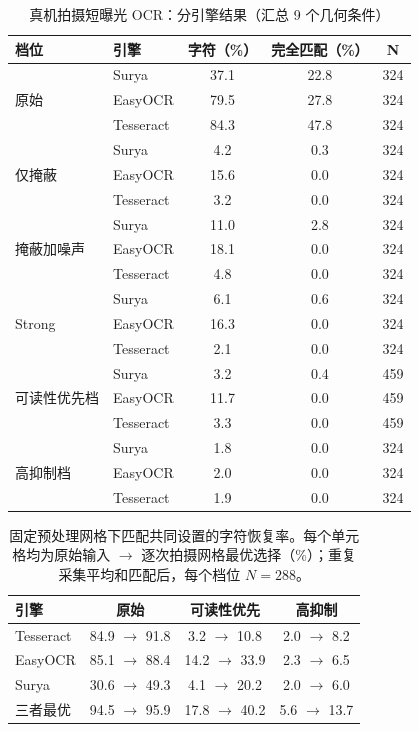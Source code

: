 \documentclass{ieeeaccess}
\begin{document}
\begin{table}[!t]
\caption{真机拍摄短曝光 OCR：分引擎结果（汇总 9 个几何条件）}
\label{tab:real_ocr_engine}
\centering
\footnotesize
\setlength{\tabcolsep}{5.5pt}
\begin{tabular}{llccc}
\toprule
档位 & 引擎 & 字符（\%） & 完全匹配（\%） & N \\
\midrule
\multirow{3}{*}{原始}
 & Surya & 37.1 & 22.8 & 324 \\
 & EasyOCR & 79.5 & 27.8 & 324 \\
 & Tesseract & 84.3 & 47.8 & 324 \\
\midrule
\multirow{3}{*}{仅掩蔽}
 & Surya & 4.2 & 0.3 & 324 \\
 & EasyOCR & 15.6 & 0.0 & 324 \\
 & Tesseract & 3.2 & 0.0 & 324 \\
\midrule
\multirow{3}{*}{掩蔽加噪声}
 & Surya & 11.0 & 2.8 & 324 \\
 & EasyOCR & 18.1 & 0.0 & 324 \\
 & Tesseract & 4.8 & 0.0 & 324 \\
\midrule
\multirow{3}{*}{Strong}
 & Surya & 6.1 & 0.6 & 324 \\
 & EasyOCR & 16.3 & 0.0 & 324 \\
 & Tesseract & 2.1 & 0.0 & 324 \\
\midrule
\multirow{3}{*}{可读性优先档}
 & Surya & 3.2 & 0.4 & 459 \\
 & EasyOCR & 11.7 & 0.0 & 459 \\
 & Tesseract & 3.3 & 0.0 & 459 \\
\midrule
\multirow{3}{*}{高抑制档}
 & Surya & 1.8 & 0.0 & 324 \\
 & EasyOCR & 2.0 & 0.0 & 324 \\
 & Tesseract & 1.9 & 0.0 & 324 \\
\bottomrule
\end{tabular}
\end{table}

\begin{table}[!t]
\caption{固定预处理网格下匹配共同设置的字符恢复率。每个单元格均为原始输入 $\rightarrow$ 逐次拍摄网格最优选择（\%）；重复采集平均和匹配后，每个档位 $N=288$。}
\label{tab:preprocessing_grid}
\centering
\footnotesize
\setlength{\tabcolsep}{4.2pt}
\begin{tabular}{lccc}
\toprule
引擎 & 原始 & 可读性优先 & 高抑制 \\
\midrule
Tesseract & 84.9 $\rightarrow$ 91.8 & 3.2 $\rightarrow$ 10.8 & 2.0 $\rightarrow$ 8.2 \\
EasyOCR & 85.1 $\rightarrow$ 88.4 & 14.2 $\rightarrow$ 33.9 & 2.3 $\rightarrow$ 6.5 \\
Surya & 30.6 $\rightarrow$ 49.3 & 4.1 $\rightarrow$ 20.2 & 2.0 $\rightarrow$ 6.0 \\
三者最优 & 94.5 $\rightarrow$ 95.9 & 17.8 $\rightarrow$ 40.2 & 5.6 $\rightarrow$ 13.7 \\
\bottomrule
\end{tabular}
\end{table}
\end{document}
